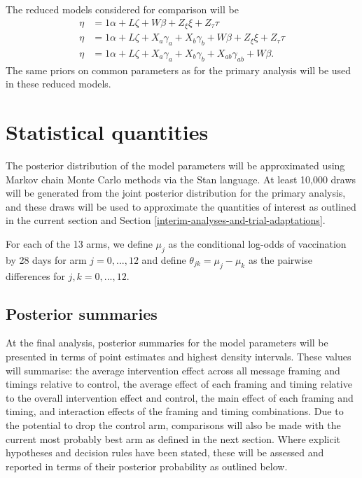 \documentclass[
  bibliography=totoc]{scrreprt}
\begin{document}
The reduced models considered for comparison will be
\[
\begin{aligned}
\eta &= 1\alpha + L\zeta + W\beta + Z_\xi\xi + Z_\tau\tau \\
\eta &= 1\alpha + L\zeta + X_a\gamma_a + X_b\gamma_b + W\beta + Z_\xi\xi + Z_\tau\tau \\
\eta &= 1\alpha + L\zeta + X_a\gamma_a + X_b\gamma_b + X_{ab}\gamma_{ab} + W\beta.
\end{aligned}
\]
The same priors on common parameters as for the primary analysis will be used in these reduced models.

\hypertarget{statistical-quantities}{%
\section{Statistical quantities}\label{statistical-quantities}}

The posterior distribution of the model parameters will be approximated using Markov chain Monte Carlo methods via the Stan language.
At least 10,000 draws will be generated from the joint posterior distribution for the primary analysis, and these draws will be used to approximate the quantities of interest as outlined in the current section and Section \ref{interim-analyses-and-trial-adaptations}.

For each of the 13 arms, we define \(\mu_j\) as the conditional log-odds of vaccination by 28 days for arm \(j=0,...,12\) and define \(\theta_{jk} = \mu_j - \mu_k\) as the pairwise differences for \(j,k=0,...,12\).

\hypertarget{posterior-summaries}{%
\subsection{Posterior summaries}\label{posterior-summaries}}

At the final analysis, posterior summaries for the model parameters will be presented in terms of point estimates and highest density intervals.
These values will summarise: the average intervention effect across all message framing and timings relative to control, the average effect of each framing and timing relative to the overall intervention effect and control, the main effect of each framing and timing, and interaction effects of the framing and timing combinations.
Due to the potential to drop the control arm, comparisons will also be made with the current most probably best arm as defined in the next section.
Where explicit hypotheses and decision rules have been stated, these will be assessed and reported in terms of their posterior probability as outlined below.
\end{document}
